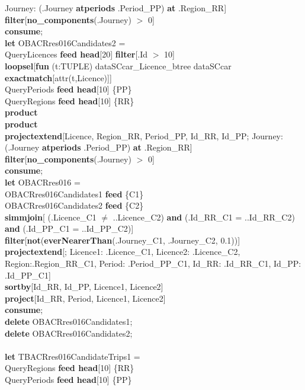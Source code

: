 \documentclass[a4paper]{article}
\newcommand{\op}[1]{\textbf{#1}}
\begin{document}
\begin{scriptsize}
\begin{tabbing}
\>\>\>Journey: (.Journey \op{atperiods} .Period\_PP) \op{at} .Region\_RR]\\
\>\op{filter}[\op{no\_components}(.Journey) $>$ 0]\\
\op{consume};\\
\op{let} OBACRres016Candidates2 =\\
\>QueryLicences \op{feed head}[20] \op{filter}[.Id $>$ 10]\\
\>\op{loopsel}[\op{fun} (t:TUPLE) dataSCcar\_Licence\_btree dataSCcar \op{exactmatch}[attr(t,Licence)]]\\
\>QueryPeriods \op{feed head}[10] \{PP\}\\
\>QueryRegions \op{feed head}[10] \{RR\}\\
\>\op{product}\\
\>\op{product}\\
\>\op{projectextend}[Licence, Region\_RR, Period\_PP, Id\_RR, Id\_PP; Journey: (.Journey \op{atperiods} .Period\_PP) \op{at} .Region\_RR]\\
\>\op{filter}[\op{no\_components}(.Journey) $>$ 0]\\
\op{consume};\\
\op{let} OBACRres016 =\\
\>OBACRres016Candidates1 \op{feed} \{C1\}\\
\>OBACRres016Candidates2 \op{feed} \{C2\}\\
\>\op{simmjoin}[ (.Licence\_C1 $\neq$ ..Licence\_C2) \op{and} (.Id\_RR\_C1 = ..Id\_RR\_C2) \op{and} (.Id\_PP\_C1 = ..Id\_PP\_C2)]\\
\>\op{filter}[\op{not}(\op{everNearerThan}(.Journey\_C1, .Journey\_C2, 0.1))]\\
\>\op{projectextend}[; Licence1: .Licence\_C1, Licence2: .Licence\_C2, Region:.Region\_RR\_C1, Period: .Period\_PP\_C1, Id\_RR: .Id\_RR\_C1, Id\_PP: .Id\_PP\_C1]\\
\>\op{sortby}[Id\_RR, Id\_PP, Licence1, Licence2]\\
\>\op{project}[Id\_RR, Period, Licence1, Licence2]\\
\op{consume};\\
\op{delete} OBACRres016Candidates1;\\
\op{delete} OBACRres016Candidates2;\\
\\
\op{let} TBACRres016CandidateTrips1 =\\
\>QueryRegions \op{feed head}[10] \{RR\}\\
\>QueryPeriods \op{feed head}[10] \{PP\}\\

\end{tabbing}
\end{scriptsize}
\end{document}
